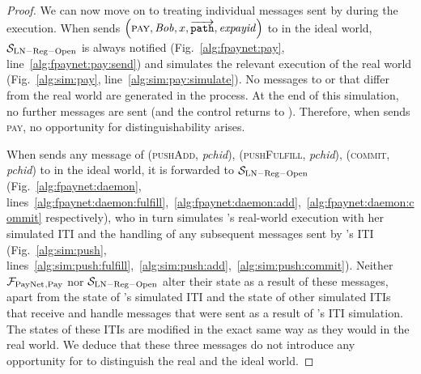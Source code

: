 \begin{proof}
  We can now move on to treating individual messages sent by \environment{}
  during the execution. When \environment{} sends $\left(\textsc{pay}, \mathit{Bob}, x,
  \overrightarrow{\mathtt{path}}, \mathit{expayid}\right)$ to \alice{} in the
  ideal world, $\mathcal{S}_{\mathrm{LN - Reg - Open}}$ is always notified
  (Fig.~\ref{alg:fpaynet:pay}, line~\ref{alg:fpaynet:pay:send}) and simulates
  the relevant execution of the real world (Fig.~\ref{alg:sim:pay},
  line~\ref{alg:sim:pay:simulate}). No messages to \ledger{} or \environment{}
  that differ from the real world are generated in the process. At the end of
  this simulation, no further messages are sent (and the control returns to
  \environment). Therefore, when \environment{} sends \textsc{pay}, no
  opportunity for distinguishability arises.

  When \environment{} sends any message of (\textsc{pushAdd}, \textit{pchid}),
  (\textsc{pushFulfill}, \textit{pchid}), (\textsc{commit}, \textit{pchid}) to
  \alice{} in the ideal world, it is forwarded to $\mathcal{S}_{\mathrm{LN - Reg
  - Open}}$ (Fig.~\ref{alg:fpaynet:daemon},
  lines~\ref{alg:fpaynet:daemon:fulfill},~\ref{alg:fpaynet:daemon:add},~\ref{alg:fpaynet:daemon:commit}
  respectively), who in turn simulates \alice's real-world execution with her
  simulated ITI and the handling of any subsequent messages sent by \alice's ITI
  (Fig.~\ref{alg:sim:push},
  lines~\ref{alg:sim:push:fulfill},~\ref{alg:sim:push:add},~\ref{alg:sim:push:commit}).
  Neither $\mathcal{F}_{\mathrm{PayNet}}{}_{\mathrm{, Pay}}$ nor $\mathcal{S}_{\mathrm{LN - Reg -
  Open}}$ alter their state as a result of these messages, apart from the state
  of \alice's simulated ITI and the state of other simulated ITIs that receive
  and handle messages that were sent as a result of \alice's ITI simulation. The
  states of these ITIs are modified in the exact same way as they would in the
  real world. We deduce that these three messages do not introduce any
  opportunity for \environment{} to distinguish the real and the ideal world.


\end{proof}
